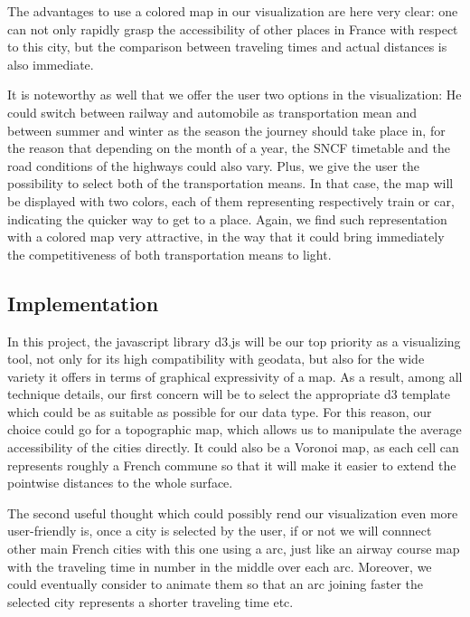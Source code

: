 \documentclass{vgtc}                          %
\begin{document}

The advantages to use a colored map in our visualization are here very clear: one can not only rapidly grasp the accessibility of other places in France with respect to this city, but the comparison between traveling times and actual distances is also immediate.

It is noteworthy as well that we offer the user two options in the visualization: He could switch between railway and automobile as transportation mean and between summer and winter as the season the journey should take place in, for the reason that depending on the month of a year, the SNCF timetable and the road conditions of the highways could also vary.
Plus, we give the user the possibility to select both of the transportation means. In that case, the map will be displayed with two colors, each of them representing respectively train or car, indicating the quicker way to get to a place. Again, we find such representation with a colored map very attractive, in the way that
it could bring immediately the competitiveness of both transportation means to light.


\subsection{Implementation}

\vspace{0.2cm}


In this project, the javascript library d3.js will be our top priority as a visualizing tool, 
not only for its high compatibility with geodata, but also for the wide variety it offers in terms of graphical expressivity of a map. 
As a result, among all technique details, our first concern will be to select the appropriate d3 template which could be as suitable as possible for our data type.
For this reason, our choice could go for a topographic map, which allows us to manipulate the average accessibility of the cities directly. It could also be a Voronoi map, as each cell can represents roughly a French commune so that it will make it easier to extend the pointwise distances to the whole surface.

The second useful thought which could possibly rend our visualization even more user-friendly is, once a city is selected by the user, if or not we will connnect other main French cities with this one using a arc, just like an airway course map with the traveling time in number in the middle over each arc. Moreover, we could  
eventually consider to animate them so that an arc joining faster the selected city represents a shorter traveling time etc.
\end{document}
